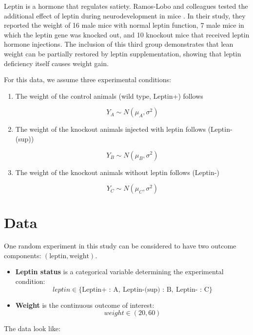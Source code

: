 \documentclass[
]{book}
\begin{document}
Leptin is a hormone that regulates satiety. Ramos-Lobo and colleagues tested the additional effect of leptin during neurodevelopment in mice \citep{Ramos-Lobo2019}. In their study, they reported the weight of 16 male mice with normal leptin function, 7 male mice in which the leptin gene was knocked out, and 10 knockout mice that received leptin hormone injections. The inclusion of this third group demonstrates that lean weight can be partially restored by leptin supplementation, showing that leptin deficiency itself causes weight gain.

For this data, we assume three experimental conditions:

\begin{enumerate}
\def\labelenumi{\arabic{enumi}.}
\item
  The weight of the control animals (wild type, Leptin+) follows

  \[
  Y_A \sim N(\mu_A, \sigma^2)
  \]
\item
  The weight of the knockout animals injected with leptin follows (Leptin-(sup))

  \[
  Y_B \sim N(\mu_B, \sigma^2)
  \]
\item
  The weight of the knockout animals without leptin follows (Leptin-)

  \[
  Y_C \sim N(\mu_C, \sigma^2)
  \]
\end{enumerate}

\hypertarget{data-4}{%
\section{Data}\label{data-4}}

One random experiment in this study can be considered to have two outcome components: \((\text{leptin}, \text{weight})\).

\begin{itemize}
\item
  \textbf{Leptin status} is a categorical variable determining the experimental condition:\\
  \[
  leptin \in \{ \text{Leptin+ : A},\ \text{Leptin-(sup) : B},\ \text{Leptin- : C} \}
  \]
\item
  \textbf{Weight} is the continuous outcome of interest:\\
  \[
  weight \in (20, 60)
  \]
\end{itemize}

The data look like:
\end{document}
